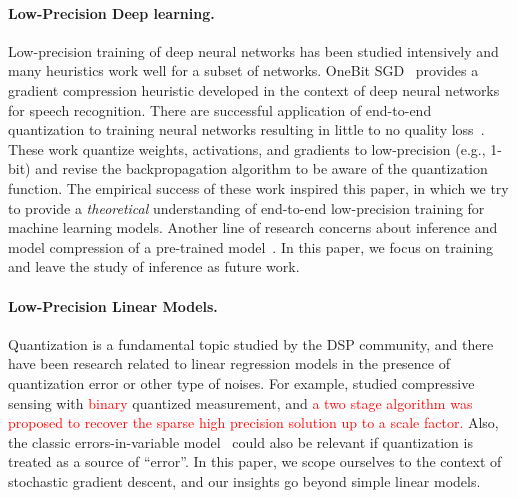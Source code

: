 \documentclass{article}
\begin{document}
\vspace{-1em}
\paragraph{Low-Precision Deep learning.}

Low-precision training of deep neural networks has been studied
intensively and many heuristics work well for a subset of networks.
OneBit SGD~\cite{Frank:2014:Interspeech} provides
a gradient compression heuristic developed in the context of deep 
neural networks for speech recognition. There are successful 
application of end-to-end quantization to training neural networks
resulting in little to no quality loss~\cite{hubara2016quantized,
rastegari2016xnor,zhou2016dorefa,miyashita2016convolutional,li2016ternary,gupta2015deep}. These work quantize weights, activations, and gradients 
to low-precision (e.g., 1-bit) and revise the backpropagation 
algorithm to be aware of the quantization function.
The empirical success of these work inspired this paper, in which we try
to provide a {\em theoretical} understanding of end-to-end low-precision
training for machine learning models.
Another line of research concerns about inference and model
compression of a pre-trained model~\cite{vanhoucke2011improving,gong2014compressing,Han:2016:ICLR,lin2016fixed,kim2016bitwise,kim2015compression,wu2016quantized}.
In this paper, we focus on training and leave the study of
inference as future work.

\vspace{-1em}
\paragraph{Low-Precision Linear Models.}

Quantization is a fundamental topic studied by the
DSP community, and there have been research related to
linear regression models in the presence of quantization
error or other type of noises. For example,
\citet{Gopi:2013:ICML} studied compressive sensing
with \textcolor{red}{binary} quantized measurement, and \textcolor{red}{a two stage algorithm was proposed to recover the sparse high precision solution up to a scale factor.}
Also, the
classic errors-in-variable model~\cite{Hall:2008:Book}
could also be relevant if quantization is treated 
as a source of ``error''. In this paper, we scope
ourselves to the context of stochastic gradient descent, 
and our insights go beyond simple linear models.
\end{document}
